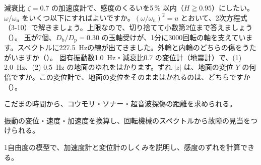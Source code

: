 \bkproblem 減衰比 $\zeta=0.7$ の加速度計で、感度のくるいを5\,\% 以内（$H\geqq0.95$）にしたい。$\omega/\omega_{\mathrm n}$ をいくつ以下にすればよいですか。$(\omega/\omega_{\mathrm n})^2=u$ とおいて、2次方程式（3-10）で解きましょう。上限なので、切り捨てて小数第2位まで答えましょう（\nobreak{}\nobreak）。
\bkproblem 玉が7個、$D_{\mathrm b}/D_{\mathrm p}=0.30$ の玉軸受けが、1分に\num{3000}回転の軸を支えています。スペクトルに\qty{227.5}{Hz}の線が出てきました。外輪と内輪のどちらの傷をうたがいますか（\nobreak{}\nobreak）。
\bkproblem 固有振動数\qty{1.0}{Hz}・減衰比0.7 の変位計（地震計）で、(1) \qty{2.0}{Hz}、(2) \qty{0.5}{Hz} の地面のゆれをはかります。ずれ $|z|$ は、地面の変位 $Y$ の何倍ですか。この変位計で、地面の変位をそのままはかれるのは、どちらですか（\nobreak{}\nobreak）。

\begin{furikaeri}
\begin{checklist}
\item こだまの時間から、コウモリ・ソナー・超音波探傷の距離を求められる。
\item 振動の変位・速度・加速度を換算し、回転機械のスペクトルから故障の見当をつけられる。
\item 1自由度の模型で、加速度計と変位計のしくみを説明し、感度のずれを計算できる。
\end{checklist}
\end{furikaeri}
